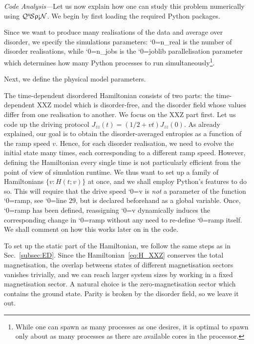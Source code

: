 \documentclass{SciPost}
\newcommand\0{\scalebox{-1}[1]{0}}
\let\svttfamily\ttfamily
\renewcommand\ttfamily{\svttfamily\catcode`0=\active }
\renewcommand\texttt{\bgroup\ttfamily\texttthelp}
\def\texttthelp#1{#1\egroup}
\newcommand{\qspin}{$\mathcal{Q}^{\mathrm{u}}\!\mathcal{S}\uprho\mathrm{\text{\textexclamdown}}\mathcal{N}$}
\begin{document}
\emph{Code Analysis---}Let us now explain how one can study this problem numerically using \qspin. We begin by first loading the required Python packages. 

%
Since we want to produce many realisations of the data and average over disorder, we specify the simulations parameters: \texttt{n\_real} is the number of disorder realisations, while \texttt{n\_jobs} is the \texttt{joblib} parallelisation parameter which determines how many Python processes to run simultaneously\footnote{While one can spawn as many processes as one desires, it is optimal to spawn only about as many processes as there are available cores in the processor.}.

%
Next, we define the physical model parameters.  

%
The time-dependent disordered Hamiltonian consists of two parts: the time-dependent XXZ model which is disorder-free, and the disorder field whose values differ from one realisation to another. We focus on the XXZ part first. Let us code up the driving protocol $J_{zz}(t) = (1/2 + vt)J_{zz}(0)$. As already explained, our goal is to obtain the disorder-averaged entropies as a function of the ramp speed $v$. Hence, for each disorder realisation, we need to evolve the initial state many times, each corresponding to a different ramp speed. However, defining the Hamiltonian every single time is not particularly efficient from the point of view of simulation runtime. We thus want to set up a family of Hamiltonians $\{v:H(t;v)\}$ at once, and we shall employ Python's features to do so. This will require that the drive speed \texttt{v} is \emph{not} a parameter of the function \texttt{ramp}, see \texttt{line 29}, but is declared beforehand as a global variable. Once, \texttt{ramp} has been defined, reassigning \texttt{v} dynamically induces the corresponding change in \texttt{ramp} without any need to re-define \texttt{ramp} itself. We shall comment on how this works later on in the code.   

%
To set up the static part of the Hamiltonian, we follow the same steps as in Sec.~\ref{subsec:ED}. Since the Hamiltonian~\eqref{eq:H_XXZ} conserves the total magnetisation, the overlap betweens states of different magnetisation sectors vanishes trivially, and we can reach larger system sizes by working in a fixed magnetisation sector. A natural choice is the zero-magnetisation sector which contains the ground state. Parity is broken by the disorder field, so we leave it out. 
\end{document}
